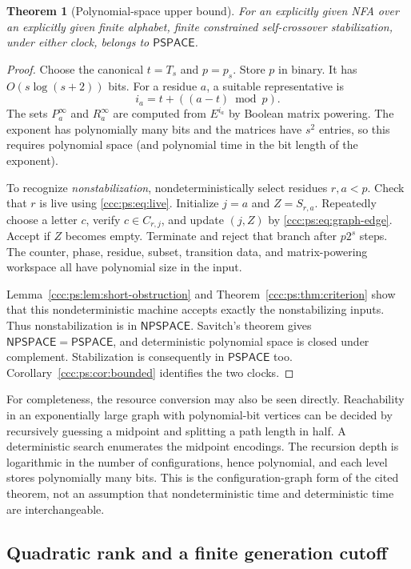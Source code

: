 \documentclass[11pt,letterpaper]{article}
\newtheorem{theorem}{Theorem}[section]
\theoremstyle{definition}
\theoremstyle{remark}
\newcommand{\PSPACE}{\mathsf{PSPACE}}
\newcommand{\NPSPACE}{\mathsf{NPSPACE}}
\begin{document}
\begin{theorem}[Polynomial-space upper bound]\label{ccc:ps:thm:pspace-upper}
For an explicitly given NFA over an explicitly given finite alphabet,
finite constrained self-crossover stabilization, under either clock,
belongs to $\PSPACE$.
\end{theorem}
\begin{proof}
Choose the canonical $t=T_s$ and $p=p_s$. Store $p$ in binary. It has
$O(s\log(s+2))$ bits. For a residue $a$, a suitable representative is
\[
 i_a=t+((a-t)\bmod p).
\]
The sets $P^\infty_a$ and $R^\infty_a$ are computed from $E^{i_a}$ by
Boolean matrix powering. The exponent has polynomially many bits and
the matrices have $s^2$ entries, so this requires polynomial space
(and polynomial time in the bit length of the exponent).

To recognize \emph{nonstabilization}, nondeterministically select residues
$r,a<p$. Check that $r$ is live using \eqref{ccc:ps:eq:live}. Initialize
$j=a$ and $Z=S_{r,a}$. Repeatedly choose a letter $c$, verify
$c\in C_{r,j}$, and update $(j,Z)$ by \eqref{ccc:ps:eq:graph-edge}. Accept if
$Z$ becomes empty. Terminate and reject that branch after $p2^s$ steps.
The counter, phase, residue, subset, transition data, and matrix-powering
workspace all have polynomial size in the input.

Lemma~\ref{ccc:ps:lem:short-obstruction} and Theorem~\ref{ccc:ps:thm:criterion} show
that this nondeterministic machine accepts exactly the nonstabilizing
inputs. Thus nonstabilization is in $\NPSPACE$. Savitch's theorem
\cite{Savitch} gives $\NPSPACE=\PSPACE$, and deterministic polynomial
space is closed under complement. Stabilization is consequently in
$\PSPACE$ too. Corollary~\ref{ccc:ps:cor:bounded} identifies the two clocks.
\end{proof}

For completeness, the resource conversion may also be seen directly.
Reachability in an exponentially large graph with polynomial-bit vertices
can be decided by recursively guessing a midpoint and splitting a path
length in half. A deterministic search enumerates the midpoint encodings.
The recursion depth is logarithmic in the number of configurations, hence
polynomial, and each level stores polynomially many bits. This is the
configuration-graph form of the cited theorem, not an assumption that
nondeterministic time and deterministic time are interchangeable.

\subsection{Quadratic rank and a finite generation cutoff}
\end{document}
